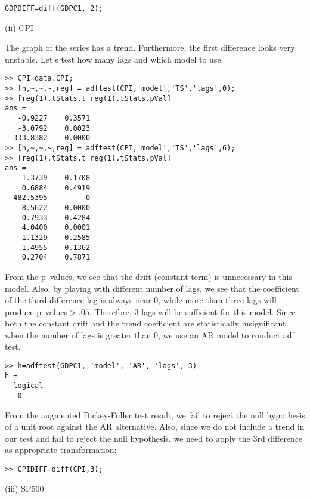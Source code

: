 \documentclass[11pt]{article}
\begin{document}
\begin{lstlisting}
GDPDIFF=diff(GDPC1, 2);
\end{lstlisting}

(ii) CPI

\begin{figure}[h]%
    \centering
    \qquad
\end{figure}

The graph of the series has a trend. Furthermore, the first difference looks very unstable. Let's test how many lags and which model to use.
\begin{lstlisting}
>> CPI=data.CPI;
>> [h,~,~,~,reg] = adftest(CPI,'model','TS','lags',0);
>> [reg(1).tStats.t reg(1).tStats.pVal]
ans =
   -0.9227    0.3571
   -3.0792    0.0023
  333.8382    0.0000
>> [h,~,~,~,reg] = adftest(CPI,'model','TS','lags',6);
>> [reg(1).tStats.t reg(1).tStats.pVal]
ans =
    1.3739    0.1708
    0.6884    0.4919
  482.5395         0
    8.5622    0.0000
   -0.7933    0.4284
    4.0400    0.0001
   -1.1329    0.2585
    1.4955    0.1362
    0.2704    0.7871
\end{lstlisting}
From the p--values, we see that the drift (constant term) is unnecessary in this model. Also, by playing with different number of lags, we see that the coefficient of the third difference lag is always near $0$, while more than three lags will produce p--values$>.05$. Therefore, $3$ lags will be sufficient for this model. Since both the constant drift and the trend coefficient are statistically insignificant when the number of lags is greater than $0$, we use an AR model to conduct adf test.
\begin{lstlisting}
>> h=adftest(GDPC1, 'model', 'AR', 'lags', 3)
h =
  logical
   0
\end{lstlisting}
From the augmented Dickey-Fuller test result, we fail to reject the null hypothesis of a unit root against the AR alternative. Also, since we do not include a trend in our test and fail to reject the null hypothesis, we need to apply the $3$rd difference as appropriate transformation:
\begin{lstlisting}
>> CPIDIFF=diff(CPI,3);
\end{lstlisting}

(iii) SP500

\begin{figure}[h]%
    \centering
    \qquad
\end{figure}
\end{document}

